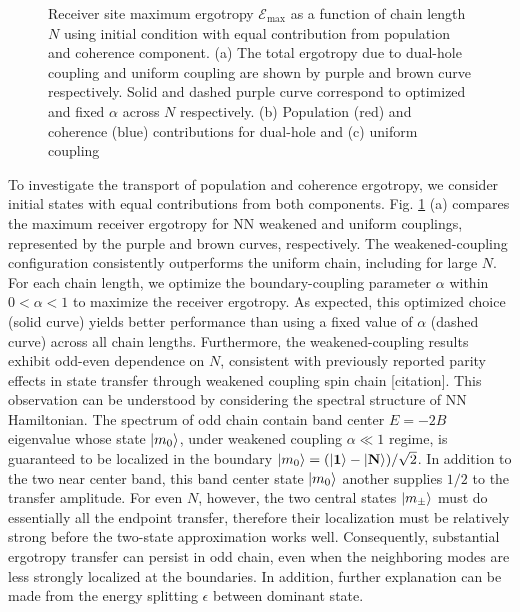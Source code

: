 \documentclass[../../../main.tex]{subfiles}
\begin{document}
\begin{figure}
  \centering
  \caption{Receiver site maximum ergotropy $\mathcal{E}_\text{max}$ as a function of chain length $N$ using initial condition with equal contribution from population and coherence component. (a) The total ergotropy due to dual-hole coupling and uniform coupling are shown by purple and brown curve respectively. Solid and dashed purple curve correspond to optimized and fixed $\alpha$ across $N$ respectively. (b) Population (red) and coherence (blue) contributions for dual-hole and (c) uniform coupling}
  \label{fig:ergocontribution}
\end{figure}

To investigate the transport of population and coherence ergotropy, we consider initial states with equal contributions from both components. 
Fig. \ref{fig:ergocontribution} (a) compares the maximum receiver ergotropy for NN weakened and uniform couplings, represented by the purple and brown curves, respectively. 
The weakened-coupling configuration consistently outperforms the uniform chain, including for large \(N\). 
For each chain length, we optimize the boundary-coupling parameter \(\alpha\) within \(0<\alpha<1\) to maximize the receiver ergotropy. 
As expected, this optimized choice (solid curve) yields better performance than using a fixed value of \(\alpha\) (dashed curve) across all chain lengths. 
Furthermore, the weakened-coupling results exhibit odd-even dependence on \(N\), consistent with previously reported parity effects in state transfer through weakened coupling spin chain [citation].
This observation can be understood by considering the spectral structure of NN Hamiltonian.
The spectrum of odd chain contain band center $E=-2B$ eigenvalue whose state $\ket{m_0}$, under weakened coupling $\alpha\ll1$ regime, is guaranteed to be localized in the boundary $\ket{m_0} = (\ket{\mathbf{1}}-\ket{\mathbf{N}})/ {\sqrt{2}}$. 
In addition to the two near center band, this band center state $\ket{m_0}$ another supplies $1/2$ to the transfer amplitude.
For even \(N\), however, the two central states $\ket{m_\pm}$ must do essentially all the endpoint transfer, therefore their localization must be relatively strong before the two-state approximation works well.
Consequently, substantial ergotropy transfer can persist in odd chain, even when the neighboring modes are less strongly localized at the boundaries.
In addition, further explanation can be made from the energy splitting $\epsilon$ between dominant state. 
\end{document}
